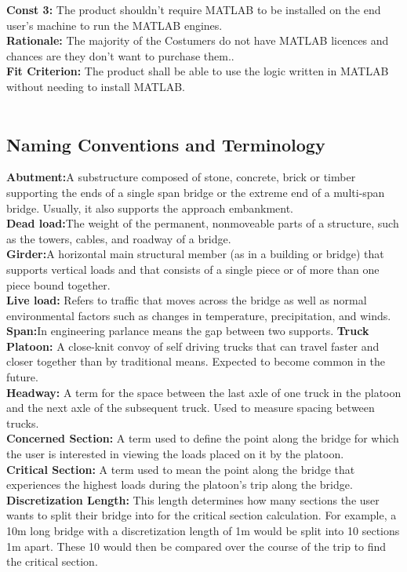 \documentclass[12pt]{article}
\begin{document}
    \textbf{Const 3:} The product shouldn't require MATLAB to be installed on the end user’s machine to run the MATLAB engines. \\
    \textbf{Rationale:} The majority of the Costumers do not have MATLAB licences and chances are they don’t want to purchase them..\\
    \textbf{Fit Criterion:} The product shall be able to use the logic written in MATLAB without needing to install MATLAB.\\\\

\subsection{Naming Conventions and Terminology}
\textbf{Abutment:}A substructure composed of stone, concrete, brick or timber supporting the ends of a single span bridge or the extreme end of a multi-span bridge. Usually, it also supports the approach embankment.\\
\textbf{Dead load:}The weight of the permanent, nonmoveable parts of a structure, such as the towers, cables, and roadway of a bridge.\\
\textbf{Girder:}A horizontal main structural member (as in a building or bridge) that supports vertical loads and that consists of a single piece or of more than one piece bound together.\\
\textbf{Live load:} Refers to traffic that moves across the bridge as well as normal environmental factors such as changes in temperature, precipitation, and winds.\\
\textbf{Span:}In engineering parlance means the gap between two supports.
\textbf{Truck Platoon:} A close-knit convoy of self driving trucks that can travel faster and closer together than by traditional means. Expected to become common in the future.\\
\textbf{Headway:} A term for the space between the last axle of one truck in the platoon and the next axle of the subsequent truck. Used to measure spacing between trucks.\\
\textbf{Concerned Section:} A term used to define the point along the bridge for which the user is interested in viewing the loads placed on it by the platoon.\\
\textbf{Critical Section:} A term used to mean the point along the bridge that experiences the highest loads during the platoon's trip along the bridge.\\
\textbf{Discretization Length:} This length determines how many sections the user wants to split their bridge into for the critical section calculation. For example,
a 10m long bridge with a discretization length of 1m would be split into 10 sections 1m apart. These 10 would then be compared over the course of the trip to find the critical
section.\\  
\end{document}
